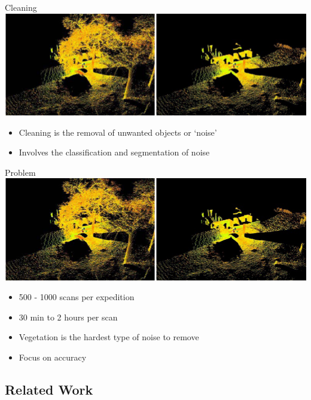 \documentclass{beamer}
\begin{document}
\begin{frame}{Cleaning}
  \includegraphics[width=1\textwidth]{pics/cleaning.png}
  \begin{itemize}
  \item
  Cleaning is the removal of unwanted objects or `noise'
  \item
  Involves the classification and segmentation of noise
  \end{itemize}
\end{frame}

\begin{frame}{Problem}
  \includegraphics[width=1\textwidth]{pics/cleaning.png}
  \begin{itemize}
  \item
  500 - 1000 scans per expedition
  \item
  30 min to 2 hours per scan
  \item
  Vegetation is the hardest type of noise to remove
  \item
  Focus on accuracy
  \end{itemize}
\end{frame}

\subsection{Related Work}
\end{document}
